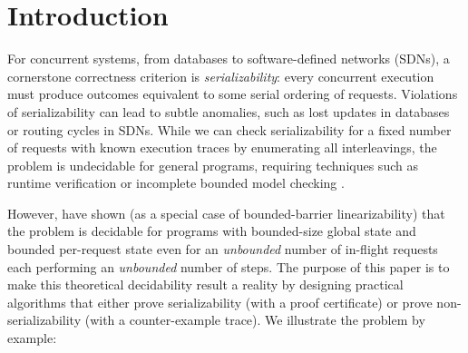 \section{Introduction}
\label{sec:introduction}

For concurrent systems, from databases to software-defined networks (SDNs), a cornerstone correctness criterion is \emph{serializability}: every concurrent execution must produce outcomes equivalent to some serial ordering of requests. Violations of serializability can lead to subtle anomalies, such as lost updates in databases or routing cycles in SDNs.
While we can check serializability for a fixed number of requests with known execution traces by enumerating all interleavings, the problem is undecidable for general programs, requiring techniques such as runtime verification or incomplete bounded model checking \cite{WaSt06a,WaSt06b,FlFrYi08,FaMa08,SiMaWaGu11a,SiMaWaGu11b,Pa79,AlMcPe96,BiEn19}.

However, \citet{BoEmEnHa13} have shown (as a special case of bounded-barrier linearizability) that the problem is decidable for programs with bounded-size global state and bounded per-request state even for an \emph{unbounded} number of in-flight requests each performing an \emph{unbounded} number of steps. The purpose of this paper is to make this theoretical decidability result a reality by designing practical algorithms that either prove serializability (with a proof certificate) or prove non-serializability (with a counter-example trace).
% 
We illustrate the problem by example:


